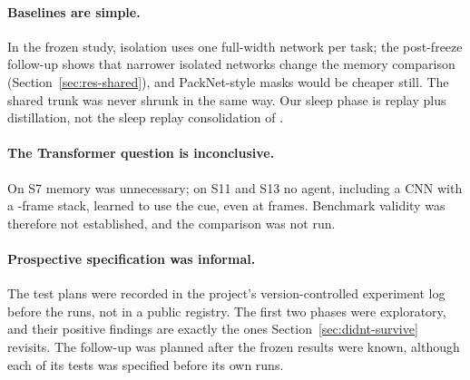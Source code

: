 \documentclass[10pt]{article}
\newif\ifanonymous
\begin{document}
\paragraph{Baselines are simple.} In the frozen study, isolation uses one full-width network per task; the post-freeze
follow-up shows that narrower isolated networks change the memory comparison (Section~\ref{sec:res-shared}), and
PackNet-style masks would be cheaper still. The shared trunk was never shrunk in the same way. Our sleep phase is replay
plus distillation, not the sleep replay consolidation of \citet{tadros2022sleep}.

\paragraph{The Transformer question is inconclusive.} On S7 memory was unnecessary; on S11 and S13 no agent, including
a CNN with a \memWindow-frame stack, learned to use the cue, even at \probeLongFrames frames. Benchmark validity was
therefore not established, and the comparison was not run.

\paragraph{Prospective specification was informal.} The test plans were recorded in the project's version-controlled
experiment log before the runs, not in a public registry. The first two phases were exploratory, and their positive
findings are exactly the ones Section~\ref{sec:didnt-survive} revisits. The follow-up was planned after the frozen
results were known, although each of its tests was specified before its own runs.

\ifanonymous
\end{document}
